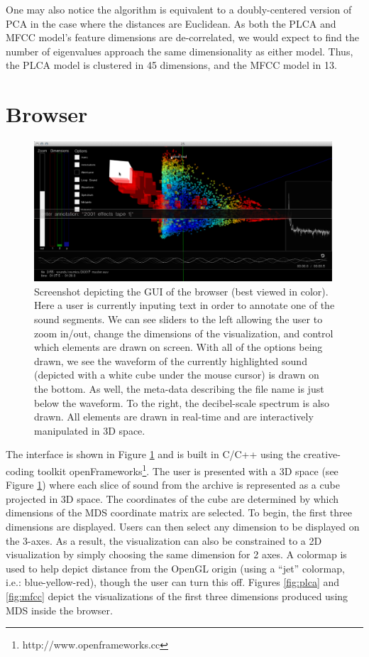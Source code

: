 One may also notice the algorithm is equivalent to a doubly-centered version of PCA in the case where the distances are Euclidean.  As both the PLCA and MFCC model's feature dimensions are de-correlated, we would expect to find the number of eigenvalues approach the same dimensionality as either model.  Thus, the PLCA model is clustered in 45 dimensions, and the MFCC model in 13.


\section{Browser}

\begin{figure}
  \centering
  \label{fig:gui}\includegraphics[width=0.99\textwidth]{images/gui.pdf}
  \caption{Screenshot depicting the GUI of the browser (best viewed in color).  Here a user is currently inputing text in order to annotate one of the sound segments.  We can see sliders to the left allowing the user to zoom in/out, change the dimensions of the visualization, and control which elements are drawn on screen.  With all of the options being drawn, we see the waveform of the currently highlighted sound (depicted with a white cube under the mouse cursor) is drawn on the bottom.  As well, the meta-data describing the file name is just below the waveform.  To the right, the decibel-scale spectrum is also drawn.  All elements are drawn in real-time and are interactively manipulated in 3D space.}
\end{figure}

The interface is shown in Figure \ref{fig:gui} and is built in C/C++ using the creative-coding toolkit openFrameworks\footnote{http://www.openframeworks.cc}.  The user is presented with a 3D space (see Figure \ref{fig:gui}) where each slice of sound from the archive is represented as a cube projected in 3D space.  The coordinates of the cube are determined by which dimensions of the MDS coordinate matrix are selected.  To begin, the first three dimensions are displayed.  Users can then select any dimension to be displayed on the 3-axes.  As a result, the visualization can also be constrained to a 2D visualization by simply choosing the same dimension for 2 axes.  A colormap is used to help depict distance from the OpenGL origin (using a ``jet'' colormap, i.e.: blue-yellow-red), though the user can turn this off.  Figures \ref{fig:plca} and \ref{fig:mfcc} depict the visualizations  of the first three dimensions produced using MDS inside the browser.  

